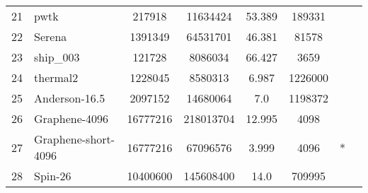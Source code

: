 \begin{tabular}{|l|l|c|c|c|c|c|c|}
{21}	& {pwtk}	& {217918}	& {11634424}	& {53.389}	& {189331}	& {} &	\\
{22}	& {Serena}	& {1391349}	& {64531701}	& {46.381}	& {81578}	& {} &	\\
{23}	& {ship\_003}	& {121728}	& {8086034}	& {66.427}	& {3659}	& {} &	\\
{24}	& {thermal2}	& {1228045}	& {8580313}	& {6.987}	& {1226000}	& {} &	\\
\midrule
{25}	& {Anderson-16.5}	& {2097152}	& {14680064}	& {7.0}	& {1198372}	& {} & \multirow{4}{*}{\rotatebox[origin=c]{90}{ESSEX}}	\\
{26}	& {Graphene-4096}	& {16777216}	& {218013704}	& {12.995}	& {4098}	& {} &	\\
{27}	& {Graphene-short-4096}	& {16777216}	& {67096576}	& {3.999}	& {4096}	& {*} &	\\
{28}	& {Spin-26}	& {10400600}	& {145608400}	& {14.0}	& {709995}	& {} &	\\
\bottomrule
\end{tabular}



